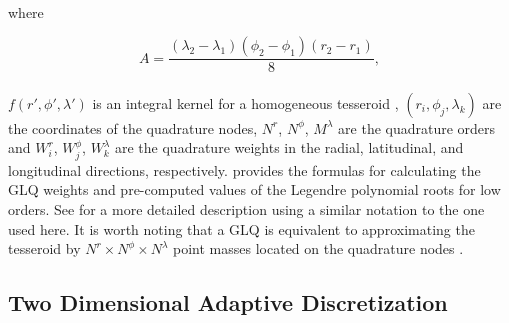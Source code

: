 \documentclass[extra, referee]{gji}
\begin{document}
\\
\noindent where

\begin{equation}
    A = \frac{(\lambda_2 - \lambda_1)(\phi_2 - \phi_1)(r_2 - r_1)}{8},
\end{equation}
\\
\noindent $f(r', \phi', \lambda')$ is an integral kernel for a homogeneous tesseroid
\citep{Grombein2013},
$(r_i, \phi_j, \lambda_k)$ are the coordinates of the quadrature nodes,
$N^r$, $N^\phi$, $M^\lambda$ are the quadrature orders and $W_i^r$, $W_j^\phi$,
$W_k^\lambda$ are the quadrature weights in the radial, latitudinal, and longitudinal
directions, respectively.
\citet[p.~391]{Hildebrand1987} provides the formulas for calculating the GLQ weights and
pre-computed values of the Legendre polynomial roots for low orders.
See \citet{Uieda2016} for a more detailed description using a similar notation to the
one used here.
It is worth noting that a GLQ is equivalent to approximating the tesseroid by $N^r
\times N^\phi \times N^\lambda$ point masses located on the quadrature nodes
\citep{Ku1977, Asgharzadeh2007}.


\subsection{Two Dimensional Adaptive Discretization}
\end{document}
